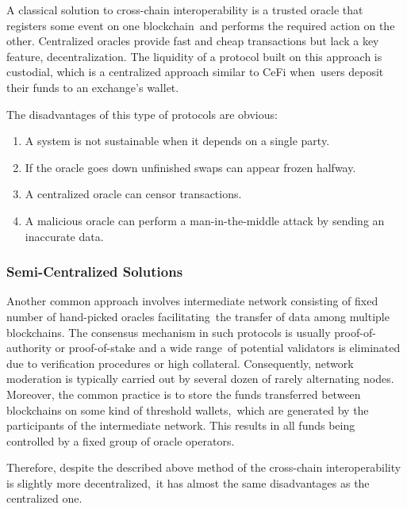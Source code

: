 A classical solution to cross-chain interoperability is a trusted oracle that registers some event on one blockchain\
and performs the required action on the other.
Centralized oracles provide fast and cheap transactions but lack a key feature, decentralization.
The liquidity of a protocol built on this approach is custodial, which is a centralized approach similar to CeFi when\
users deposit their funds to an exchange's wallet.

The disadvantages of this type of protocols are obvious:
\begin{enumerate}
    \item A system is not sustainable when it depends on a single party.
    \item If the oracle goes down unfinished swaps can appear frozen halfway.
    \item A centralized oracle can censor transactions.
    \item A malicious oracle can perform a man-in-the-middle attack by sending an inaccurate data.
\end{enumerate}

\subsubsection{Semi-Centralized Solutions}\label{subsubsec:semi-centralized-solutions}

Another common approach involves intermediate network consisting of fixed number of hand-picked oracles facilitating\
the transfer of data among multiple blockchains.
The consensus mechanism in such protocols is usually proof-of-authority or proof-of-stake and a wide range\
of potential validators is eliminated due to verification procedures or high collateral.
Consequently, network moderation is typically carried out by several dozen of rarely alternating nodes.
Moreover, the common practice is to store the funds transferred between blockchains on some kind of threshold wallets,\
which are generated by the participants of the intermediate network.
This results in all funds being controlled by a fixed group of oracle operators.

Therefore, despite the described above method of the cross-chain interoperability is slightly more decentralized,\
it has almost the same disadvantages as the centralized one.